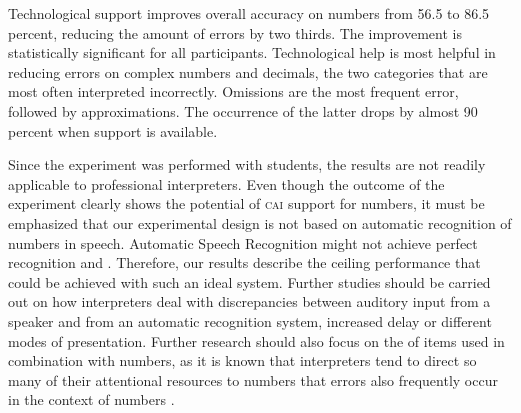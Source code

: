 \documentclass[output=paper]{langsci/langscibook}
\begin{document}
Technological support improves overall accuracy on numbers from 56.5 to 86.5 percent, reducing the amount of errors by two thirds. The improvement is statistically significant for all participants. Technological help is most helpful in reducing errors on complex numbers and decimals, the two categories that are most often interpreted incorrectly. Omissions are the most frequent error, followed by approximations. The occurrence of the latter drops by almost 90 percent when support is available.

Since the experiment was performed with students, the results are not readily applicable to professional interpreters. Even though the outcome of the experiment clearly shows the potential of \textsc{cai} support for numbers, it must be emphasized that our experimental design is not based on automatic recognition of numbers in speech. Automatic Speech Recognition might not achieve perfect recognition and . Therefore, our results describe the ceiling performance that could be achieved with such an ideal system. Further studies should be carried out on how interpreters deal with discrepancies between auditory input from a speaker and  from an automatic recognition system, increased delay or different modes of presentation. Further research should also focus on the  of items used in combination with numbers, as it is known that interpreters tend to direct so many of their attentional resources to numbers that errors also frequently occur in the context of numbers \citep{Gile2009}.

\sloppy
\printbibliography[heading=subbibliography,notkeyword=this]
\end{document}
